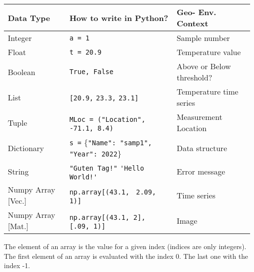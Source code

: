 \ifanswers
  \begin{tcolorbox}[enhanced jigsaw,breakable,pad at break*=1mm,
  colback=blue!5!white,colframe=babyblueeyes,title=Solutions,
  watermark color=white]
  \begin{center}
        \begin{tabularx}{\linewidth}{ X | X | X }
        \textbf{Data Type} & \textbf{How to write in Python?} & \textbf{Geo- Env. Context}\\
        \hline
        Integer & \verb|a = 1| & Sample number \\
        Float & \verb|t = 20.9| & Temperature value \\
        Boolean & \verb|True, False| & Above or Below threshold? \\
        List & \verb|[20.9,| \verb|23.3,| \verb|23.1]| & Temperature time series \\
        Tuple & \verb|MLoc = ("Location",| \verb| -71.1, 8.4)| & Measurement Location \\
        Dictionary & \verb|s =| \{\verb|"Name": "samp1",| \verb|"Year": 2022|\}  & Data structure\\
        String & \verb|"Guten Tag!"| \verb|'Hello World!'| & Error message \\
        Numpy Array [Vec.] & \verb|np.array[(43.1,| \verb| 2.09, 1)]| & Time series \\
        Numpy Array [Mat.] & \verb|np.array[(43.1, 2],| \verb| [.09, 1)]| & Image \\
      \end{tabularx}
    \end{center}
  The element of an array is the value for a given index (indices are only integers). The first element of an array is evaluated with the index 0. The last one with the index -1. 
  \end{tcolorbox}
\fi


